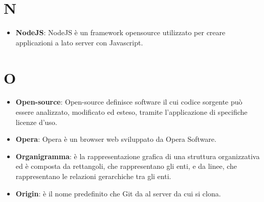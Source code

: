 \documentclass[a4paper, oneside, openany]{article}
\begin{document}
\section{N}
\begin{itemize}
\item \textbf{NodeJS}: NodeJS è un framework opensource utilizzato per creare applicazioni a lato server con Javascript.
\end{itemize}

\section{O}
\begin{itemize}
\item \textbf{Open-source}: Open-source definisce software il cui codice sorgente può essere analizzato, modificato ed esteso, tramite l'applicazione di specifiche licenze d'uso.
\item \textbf{Opera}: Opera è un browser web sviluppato da Opera Software.
\item \textbf{Organigramma}: è la rappresentazione grafica di una struttura organizzativa ed è composta da rettangoli, che rappresentano gli enti, e da linee, che rappresentano le relazioni gerarchiche tra gli enti.
\item \textbf{Origin}: è il nome predefinito che Git da al server da cui si clona.
\end{itemize}
\end{document}
